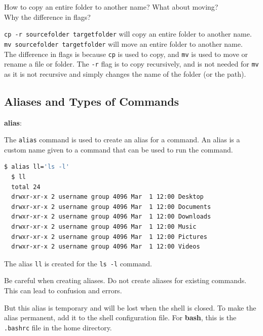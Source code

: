 \begin{qs}
  How to copy an entire folder to another name? What about moving? \\
  Why the difference in flags?
\end{qs}

\begin{ans}
  \texttt{cp -r sourcefolder targetfolder} will copy an entire folder to another name. \\
  \texttt{mv sourcefolder targetfolder} will move an entire folder to another name. \\
  The difference in flags is because \texttt{cp} is used to copy, and \texttt{mv} is used to move or rename a file or folder.
  The \texttt{-r} flag is to copy recursively, and is not needed for \texttt{mv} as it is not recursive
  and simply changes the name of the folder (or the path).
\end{ans}

\subsection{Aliases and Types of Commands}

\textbf{alias}:

The \texttt{alias} command is used to create an alias for a command.
An alias is a custom name given to a command that can be used to run the command.

\begin{lstlisting}[language=bash]
  $ alias ll='ls -l'
  $ ll
  total 24
  drwxr-xr-x 2 username group 4096 Mar  1 12:00 Desktop
  drwxr-xr-x 2 username group 4096 Mar  1 12:00 Documents
  drwxr-xr-x 2 username group 4096 Mar  1 12:00 Downloads
  drwxr-xr-x 2 username group 4096 Mar  1 12:00 Music
  drwxr-xr-x 2 username group 4096 Mar  1 12:00 Pictures
  drwxr-xr-x 2 username group 4096 Mar  1 12:00 Videos
\end{lstlisting}

The alias \texttt{ll} is created for the \texttt{ls -l} command.

\begin{warn}
  Be careful when creating aliases.
  Do not create aliases for existing commands.
  This can lead to confusion and errors.
\end{warn}

But this alias is temporary and will be lost when the shell is closed.
To make the alias permanent, add it to the shell configuration file.
For \textbf{bash}, this is the \texttt{.bashrc} file in the home directory.

